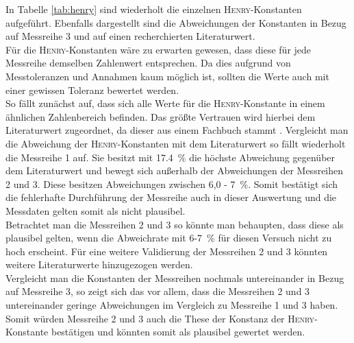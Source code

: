 In Tabelle \ref{tab:henry} sind wiederholt die einzelnen \textsc{Henry}-Konstanten aufgeführt. Ebenfalls dargestellt sind die Abweichungen der Konstanten in Bezug auf Messreihe 3 und auf einen recherchierten Literaturwert.\\
Für die \textsc{Henry}-Konstanten wäre zu erwarten gewesen, dass diese für jede Messreihe demselben Zahlenwert entsprechen. Da dies aufgrund von Messtoleranzen und Annahmen kaum möglich ist, sollten die Werte auch mit einer gewissen Toleranz bewertet werden.\\
So fällt zunächst auf, dass sich alle Werte für die \textsc{Henry}-Konstante in einem ähnlichen Zahlenbereich befinden. Das größte Vertrauen wird hierbei dem Literaturwert zugeordnet, da dieser aus einem Fachbuch stammt \cite{Draxler.2014}. Vergleicht man die Abweichung der \textsc{Henry}-Konstanten mit dem Literaturwert so fällt wiederholt die Messreihe 1 auf. Sie besitzt mit \SI{17,4}{\percent } die höchste Abweichung gegenüber dem Literaturwert und bewegt sich außerhalb der Abweichungen der Messreihen 2 und 3. 
\newpage
Diese besitzen Abweichungen zwischen 6,0 - \SI{7}{\percent}. Somit bestätigt sich die fehlerhafte Durchführung der Messreihe auch in dieser Auswertung und die Messdaten gelten somit als nicht plausibel.\\
Betrachtet man die Messreihen 2 und 3 so könnte man behaupten, dass diese als plausibel gelten, wenn die Abweichrate mit 6-\SI{7}{\percent} für diesen Versuch nicht zu hoch erscheint. Für eine weitere Validierung der Messreihen 2 und 3 könnten weitere Literaturwerte hinzugezogen werden.\\
Vergleicht man die Konstanten der Messreihen nochmals untereinander in Bezug auf Messreihe 3, so zeigt sich das vor allem, dass die Messreihen 2 und 3 untereinander geringe Abweichungen im Vergleich zu Messreihe 1 und 3 haben. Somit würden Messreihe 2 und 3 auch die These der Konstanz der \textsc{Henry}-Konstante bestätigen und könnten somit als plausibel gewertet werden.\\

